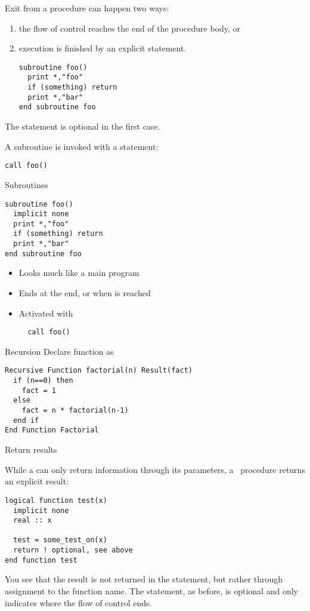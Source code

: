 Exit from a procedure can happen two ways:
\begin{enumerate}
\item the flow of control reaches the end of the procedure body, or
\item execution is finished by an explicit 
  statement.
\begin{verbatim}
subroutine foo()
  print *,"foo"
  if (something) return
  print *,"bar"
end subroutine foo
\end{verbatim}
\end{enumerate}
The  statement is optional in the first case.

A subroutine is invoked with a  statement:
\begin{verbatim}
call foo()
\end{verbatim}

\begin{slide}{Subroutines}
  \label{sl:subroutine}
\begin{verbatim}
subroutine foo()
  implicit none
  print *,"foo"
  if (something) return
  print *,"bar"
end subroutine foo
\end{verbatim}
\begin{itemize}
\item Looks much like a main program
\item Ends at the end, or when  is reached
\item Activated with 
\begin{verbatim}
  call foo()
\end{verbatim}
\end{itemize}
\end{slide}

\begin{block}{Recursion}
  \label{sl:funcf:recursion}
  Declare function as ~
\begin{verbatim}
Recursive Function factorial(n) Result(fact)
  if (n==0) then
    fact = 1
  else
    fact = n * factorial(n-1)
  end if
End Function Factorial
\end{verbatim}
\end{block}

 {Return results}

While a  can only return information through its parameters,
a~ procedure returns an explicit result:
\begin{verbatim}
logical function test(x)
  implicit none
  real :: x

  test = some_test_on(x)
  return ! optional, see above
end function test
\end{verbatim}
You see that the result is not returned in the  statement,
but rather through assignment to the function name. The 
statement, as before, is optional and only indicates where the flow of
control ends.

